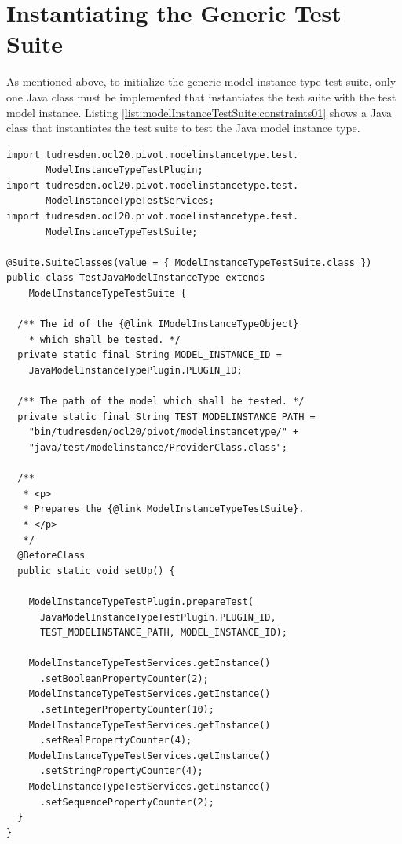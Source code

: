 \section{Instantiating the Generic Test Suite}
\label{modelInstanceTestSuite:setupTestSuite}

As mentioned above, to initialize the generic model instance type test suite, only one Java class must be implemented that instantiates the test suite with the test model instance. Listing \ref{list:modelInstanceTestSuite:constraints01} shows a Java class that instantiates the test suite to test the Java model instance type.

\lstset{
  language=Java
}
\begin{lstlisting}[caption={An instantiation of the generic model instance test suite.}, captionpos=b, label=list:modelInstanceTestSuite:constraints01, float]
import tudresden.ocl20.pivot.modelinstancetype.test.
       ModelInstanceTypeTestPlugin;
import tudresden.ocl20.pivot.modelinstancetype.test.
       ModelInstanceTypeTestServices;
import tudresden.ocl20.pivot.modelinstancetype.test.
       ModelInstanceTypeTestSuite;

@Suite.SuiteClasses(value = { ModelInstanceTypeTestSuite.class })
public class TestJavaModelInstanceType extends 
    ModelInstanceTypeTestSuite {

  /** The id of the {@link IModelInstanceTypeObject} 
    * which shall be tested. */
  private static final String MODEL_INSTANCE_ID =
    JavaModelInstanceTypePlugin.PLUGIN_ID;

  /** The path of the model which shall be tested. */
  private static final String TEST_MODELINSTANCE_PATH =
    "bin/tudresden/ocl20/pivot/modelinstancetype/" +
    "java/test/modelinstance/ProviderClass.class";

  /**
   * <p>
   * Prepares the {@link ModelInstanceTypeTestSuite}.
   * </p>
   */
  @BeforeClass
  public static void setUp() {

    ModelInstanceTypeTestPlugin.prepareTest(
      JavaModelInstanceTypeTestPlugin.PLUGIN_ID, 
      TEST_MODELINSTANCE_PATH, MODEL_INSTANCE_ID);

    ModelInstanceTypeTestServices.getInstance()
      .setBooleanPropertyCounter(2);
    ModelInstanceTypeTestServices.getInstance()
      .setIntegerPropertyCounter(10);
    ModelInstanceTypeTestServices.getInstance()
      .setRealPropertyCounter(4);
    ModelInstanceTypeTestServices.getInstance()
      .setStringPropertyCounter(4);
    ModelInstanceTypeTestServices.getInstance()
      .setSequencePropertyCounter(2);
  }
}
\end{lstlisting}

